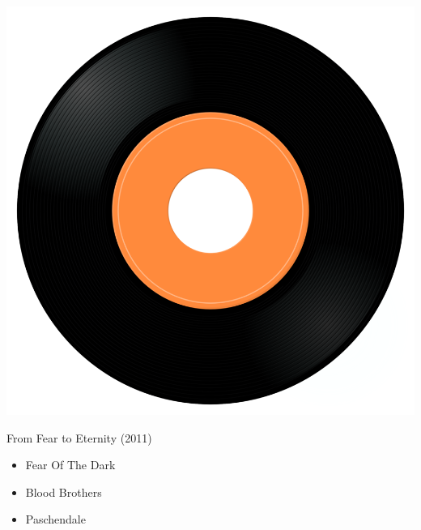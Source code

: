 \begin{minipage}[t]{0.25\textwidth}
\captionsetup{type=figure}
\includegraphics[width=\textwidth]{Images/cover.png}
\caption*{From Fear to Eternity (2011)}
\end{minipage}
\begin{minipage}[t]{0.25\textwidth}\vspace{0pt}
\begin{itemize}[nosep,leftmargin=1em,labelwidth=*,align=left]
	\setlength{\itemsep}{0pt}
	\item Fear Of The Dark
	\item Blood Brothers
	\item Paschendale
\end{itemize}
\end{minipage}
